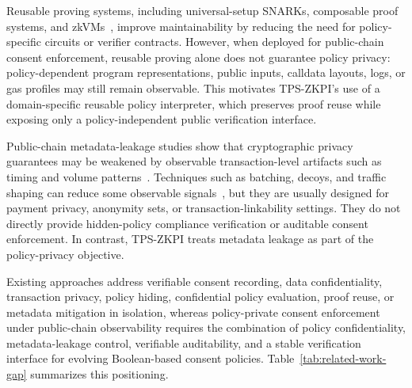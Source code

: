 Reusable proving systems, including universal-setup SNARKs, composable proof systems, and zkVMs~\cite{gabizon2019plonk,campanelli2019legosnark,liu2025ceno}, improve maintainability by reducing the need for policy-specific circuits or verifier contracts.
However, when deployed for public-chain consent enforcement, reusable proving alone does not guarantee policy privacy: policy-dependent program representations, public inputs, calldata layouts, logs, or gas profiles may still remain observable.
This motivates TPS-ZKPI's use of a domain-specific reusable policy interpreter, which preserves proof reuse while exposing only a policy-independent public verification interface.

Public-chain metadata-leakage studies show that cryptographic privacy
guarantees may be weakened by observable transaction-level artifacts such as
timing and volume patterns~\cite{beres2021blockchain}. Techniques such as batching,
decoys, and traffic shaping can reduce some observable signals~\cite{miller2023vtbc}, but they are
usually designed for payment privacy, anonymity sets, or transaction-linkability
settings. They do not directly provide hidden-policy compliance verification
or auditable consent enforcement. In contrast, TPS-ZKPI treats metadata leakage as
part of the policy-privacy objective.

Existing approaches address verifiable consent recording, data confidentiality,
transaction privacy, policy hiding, confidential policy evaluation, proof reuse, or
metadata mitigation in isolation,
whereas policy-private consent enforcement under public-chain observability requires
the combination of policy confidentiality, metadata-leakage control, verifiable
auditability, and a stable verification interface for evolving Boolean-based consent
policies. Table~\ref{tab:related-work-gap}
summarizes this positioning.


